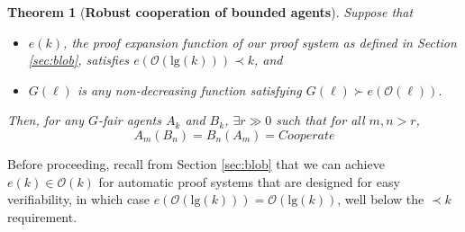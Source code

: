 \documentclass[jsl,reqno,bibay2]{asl}
\newcommand{\ef}{e}
\newtheorem{theorem}{Theorem}
\numberwithin{equation}{section}
\theoremstyle{definition}
\newcommand{\Oo}{\mathcal{O}}
\renewcommand{\lg}[1]{\mathrm{lg}(#1)}
\renewcommand{\-}{^{-1}}
\begin{document}
\begin{theorem}[{\bf Robust cooperation of bounded agents}]\label{thm:rc}Suppose that 
\begin{itemize}
\item $\ef(k)$, the proof expansion function of our proof system as defined in Section \ref{sec:blob}, satisfies $\ef (\Oo(\lg{k})) \prec k$, and
\item $G(\ell)$ is any non-decreasing function satisfying $G(\ell) \succ \ef(\Oo(\ell)).$
\end{itemize}
Then, for any $G$-fair agents $A_k$ and $B_k$, $\exists r \gg 0$ such that for all $m,n>r$,
$$A_m(B_n) = B_n(A_m) = Cooperate$$
\end{theorem}

 Before proceeding, recall from Section \ref{sec:blob} that we can achieve $\ef(k) \in \Oo(k)$ for automatic proof systems that are designed for easy verifiability, in which case $\ef(\Oo(\lg{k})) = \Oo(\lg{k})$, well below the $\prec k$ requirement.
\end{document}
